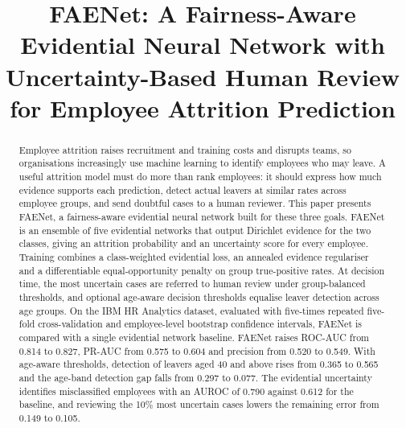 \documentclass[conference]{IEEEtran}
\begin{document}
\title{FAENet: A Fairness-Aware Evidential Neural Network with Uncertainty-Based Human Review for Employee Attrition Prediction}

\author{
\and
{}
}

\maketitle

\begin{abstract}
Employee attrition raises recruitment and training costs and disrupts teams, so organisations increasingly use machine learning to identify employees who may leave. A useful attrition model must do more than rank employees: it should express how much evidence supports each prediction, detect actual leavers at similar rates across employee groups, and send doubtful cases to a human reviewer. This paper presents FAENet, a fairness-aware evidential neural network built for these three goals. FAENet is an ensemble of five evidential networks that output Dirichlet evidence for the two classes, giving an attrition probability and an uncertainty score for every employee. Training combines a class-weighted evidential loss, an annealed evidence regulariser and a differentiable equal-opportunity penalty on group true-positive rates. At decision time, the most uncertain cases are referred to human review under group-balanced thresholds, and optional age-aware decision thresholds equalise leaver detection across age groups. On the IBM HR Analytics dataset, evaluated with five-times repeated five-fold cross-validation and employee-level bootstrap confidence intervals, FAENet is compared with a single evidential network baseline. FAENet raises ROC-AUC from 0.814 to 0.827, PR-AUC from 0.575 to 0.604 and precision from 0.520 to 0.549. With age-aware thresholds, detection of leavers aged 40 and above rises from 0.365 to 0.565 and the age-band detection gap falls from 0.297 to 0.077. The evidential uncertainty identifies misclassified employees with an AUROC of 0.790 against 0.612 for the baseline, and reviewing the 10\% most uncertain cases lowers the remaining error from 0.149 to 0.105.
\end{abstract}
\end{document}
